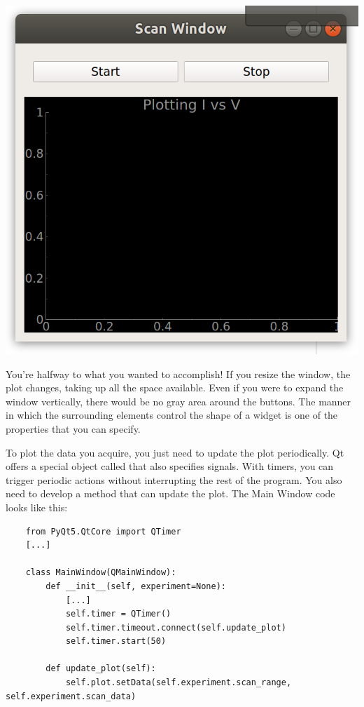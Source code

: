 \begin{center}
    \includegraphics[width=.4\textwidth]{images/Chapter_08/07_window_empty_plot.png}
\end{center}

You're halfway to what you wanted to accomplish! If you resize the window, the plot changes, taking up all the space available. Even if you were to expand the window vertically, there would be no gray area around the buttons. The manner in which the surrounding elements control the shape of a widget is one of the properties that you can specify.


To plot the data you acquire, you just need to update the plot periodically. Qt offers a special object called  that also specifies signals. With timers, you can trigger periodic actions without interrupting the rest of the program. You also need to develop a method that can update the plot. The Main Window code looks like this:

\begin{verbatim}
    from PyQt5.QtCore import QTimer
    [...]

    class MainWindow(QMainWindow):
        def __init__(self, experiment=None):
            [...]
            self.timer = QTimer()
            self.timer.timeout.connect(self.update_plot)
            self.timer.start(50)

        def update_plot(self):
            self.plot.setData(self.experiment.scan_range, self.experiment.scan_data)
\end{verbatim}

